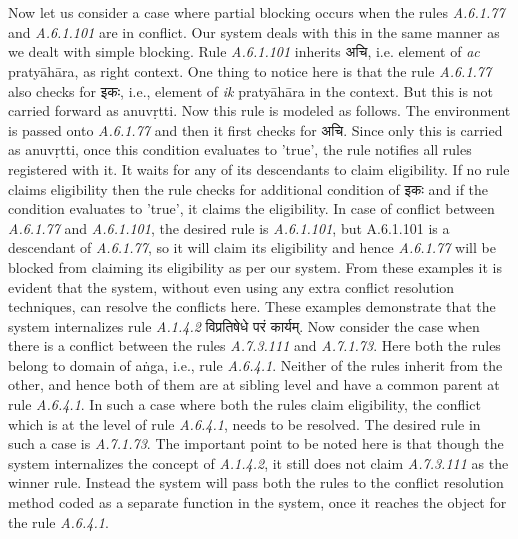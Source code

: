 \documentclass[a4paper,11pt,twoside,openright]{report}
\begin{document}
\\ \\
Now let us consider a case where partial blocking occurs when the rules \textsl{ A.6.1.77} and \textsl{ A.6.1.101} are in conflict. Our system deals with this in the same manner as we dealt with simple blocking. Rule \textsl{ A.6.1.101} inherits {\skt अचि}, i.e. element of \textsl{ ac} pratyāhāra, as right context. One thing to notice here is that the rule \textsl{ A.6.1.77} also checks for {\skt इकः}, i.e.,  element of \textsl{ ik} pratyāhāra in the context. But this is not carried forward as anuvṛtti. Now this rule is modeled as follows. The environment is passed onto \textsl{ A.6.1.77} and then it first checks for {\skt अचि}. Since only this is carried as anuvṛtti, once this condition evaluates to 'true', the rule notifies all rules registered with it. It waits for any of its descendants to claim eligibility. If no rule claims eligibility then the rule checks for additional condition of {\skt इकः} and if the condition evaluates to 'true', it claims the eligibility. In case of conflict between \textsl{ A.6.1.77} and \textsl{ A.6.1.101}, the desired rule is \textsl{ A.6.1.101}, but A.6.1.101 is a descendant of \textsl{ A.6.1.77}, so it will claim its eligibility and hence \textsl{ A.6.1.77} will be blocked from claiming its eligibility as per our system. From these examples it is evident that the system, without even using any extra conflict resolution techniques, can resolve the conflicts here. These examples demonstrate that the system internalizes rule \textsl{ A.1.4.2} {\skt विप्रतिषेधे परं कार्यम्}. Now consider the case when there is a conflict between the rules \textsl{ A.7.3.111} and \textsl{ A.7.1.73}.  Here both the rules belong to domain of aṅga, i.e., rule \textsl{ A.6.4.1}. Neither of the rules inherit from the other, and hence both of them are at sibling level and have a common parent at rule \textsl{ A.6.4.1}. In such a case where both the rules claim eligibility, the conflict which is at the level of rule \textsl{ A.6.4.1}, needs to be resolved. The desired rule in such a case is \textsl{ A.7.1.73}. The important point to be noted here is that though the system internalizes the concept of \textsl{ A.1.4.2}, it still does not claim \textsl{ A.7.3.111} as the winner rule. Instead the system will pass both the rules to the conflict resolution method coded as a separate function in the system, once it reaches the object for the rule \textsl{ A.6.4.1}.  
\end{document}

